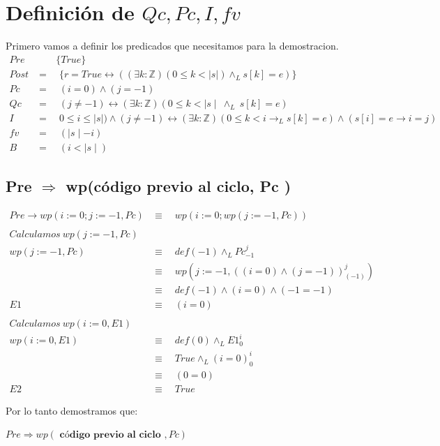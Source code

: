 \documentclass[12pt]{book}
\begin{document}
\section{Definici\'on de $ Qc, Pc, I, fv$}
Primero vamos a definir los predicados que necesitamos para la demostracion.
\begin{align*}
Pre & \quad \quad \{ True \}  \\
Post &= \quad \{ r = True \leftrightarrow ((\exists k :\mathbb{Z})(0 \leq k < |s|) \wedge_L s[k] = e)\} \\
Pc &= \quad (i = 0) \wedge (j = -1) \\
Qc &=  \quad(j \neq -1) \leftrightarrow (\exists k : \mathbb{Z})(0 \leq k < \mid s\mid \ \wedge_{L} \ s[k] = e) \\
I &= \quad 0 \leq i \leq  \mid s \mid) \wedge (j \neq -1) \leftrightarrow (\exists k : \mathbb{Z})(0 \leq k < i \rightarrow_L s[k] = e) \wedge (s[i] = e \rightarrow i = j)  \\
fv &= \quad ( \mid s \mid - i )\\
B &= \quad (i < \mid s \mid)
\end{align*}

\subsection{ Pre $\Rightarrow $ wp(código previo al ciclo, Pc )}
\begin{align*}
Pre \rightarrow wp(i:= 0; j := -1, Pc ) & \equiv \quad wp(i := 0; wp(j := -1, Pc )) \\ \\
Calculamos \ wp(j := -1, Pc ) & \\ 
wp(j := -1, Pc ) &\equiv \quad  def (-1) \wedge_L Pc_{-1}^j \\
 &\equiv \quad wp(j := -1, \left( (i = 0) \wedge (j = -1)\right)_{(-1)}^j ) \\
&\equiv \quad def (-1) \wedge (i = 0) \wedge (-1 = -1) \\
E1 &\equiv \quad  (i = 0) \\ \\
Calculamos \ wp(i := 0, E1) & \\
wp(i := 0, E1 ) &\equiv \quad  def (0) \wedge_L E1_{0}^i  \\
&\equiv \quad  True \wedge_L (i = 0)_{0}^i \\
&\equiv \quad (0 = 0) \\
E2 &\equiv \quad True 
\end{align*}
\begin{shaded}
Por lo tanto demostramos que: 
\begin{center}
$ Pre \Rightarrow wp( \textbf{ c\'odigo previo al ciclo } , Pc) $
\end{center}
\end{shaded}
\end{document}
